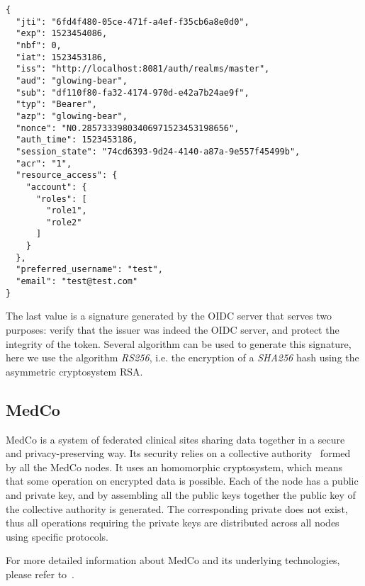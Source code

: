 \begin{verbatim}
{
  "jti": "6fd4f480-05ce-471f-a4ef-f35cb6a8e0d0",
  "exp": 1523454086,
  "nbf": 0,
  "iat": 1523453186,
  "iss": "http://localhost:8081/auth/realms/master",
  "aud": "glowing-bear",
  "sub": "df110f80-fa32-4174-970d-e42a7b24ae9f",
  "typ": "Bearer",
  "azp": "glowing-bear",
  "nonce": "N0.28573339803406971523453198656",
  "auth_time": 1523453186,
  "session_state": "74cd6393-9d24-4140-a87a-9e557f45499b",
  "acr": "1",
  "resource_access": {
    "account": {
      "roles": [
        "role1",
        "role2"
      ]
    }
  },
  "preferred_username": "test",
  "email": "test@test.com"
}
\end{verbatim}

The last value is a signature generated by the OIDC server that serves two purposes: verify that the issuer was indeed the OIDC server, and protect the integrity of the token.
Several algorithm can be used to generate this signature, here we use the algorithm \emph{RS256}, i.e. the encryption of a \emph{SHA256} hash using the asymmetric cryptosystem RSA.


\subsection{MedCo}
\label{sec:bg-medco}

MedCo is a system of federated clinical sites sharing data together in a secure and privacy-preserving way.
Its security relies on a collective authority~\cite{todo} formed by all the MedCo nodes.
It uses an homomorphic cryptosystem, which means that some operation on encrypted data is possible. 
Each of the node has a public and private key, and by assembling all the public keys together the public key of the collective authority is generated.
The corresponding private does not exist, thus all operations requiring the private keys are distributed across all nodes using specific protocols.

For more detailed information about MedCo and its underlying technologies, please refer to~\cite{todo}.
